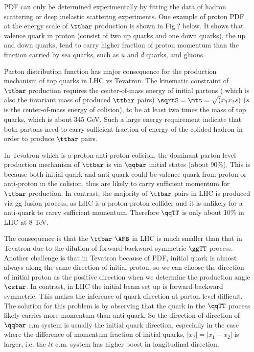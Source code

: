 PDF can only be determined experimentally by fitting the data of hadron scattering or deep inelastic scattering experiments. One example of proton PDF at the energy scale of $\ttbar$ production is shown in Fig.? below. It shows that valence quark in proton (consist of two up quarks and one down quarks), the up and down quarks, tend to carry higher fraction of proton momentum than the fraction carried by sea quarks, such as $\bar u$ and $\bar d$ quarks, and gluons.  

Parton distribution function has major consequence for the production mechanism of top quarks in LHC vs Tevatron. The kinematic constraint of $\ttbar$ production requires the center-of-mass energy of initial partons ( which is also the invariant mass of produced $\ttbar$ pairs) $\sqrtS=\mtt=\sqrt(x_1x_2s)$ ($s$ is the center-of-mass energy of colision), to be at least two times the mass of top quarks, which is about 345 GeV. Such a large energy requirement indicate that both partons need to carry sufficient fraction of energy of the colided hadron in order to produce $\ttbar$ pairs.  

In Tevatron which is a proton anti-proton colision, the dominant parton level production mechanism of $\ttbar$ is via $\qqbar$ initial states (about 90\%). This is because both initial quark and anti-quark could be valence quark from proton or anti-proton in the colision, thus are likely to carry sufficient momentum for $\ttbar$ production. In contrast, the majority of $\ttbar$ pairs in LHC is produced via gg fusion process, as LHC is a proton-proton collider and it is unlikely for a anti-quark to carry sufficient momentum. Therefore $\qqTT$ is only about 10\% in LHC at 8 TeV. 

The consequence is that the $\ttbar$ $\AFB$ in LHC is much smaller than that in Tevatron due to the dilution of forward-backward symmetric $\ggTT$ process. Another challenge is that in Tevatron because of PDF, initial quark is almost always along the same direction of initial proton, so we can choose the direction of initial proton as the positive direction when we determine the production angle $\cstar$. In contrast, in LHC the initial beam set up is forward-backward symmetric. This makes the inference of quark direction at parton level difficult. The solution for this problem is by observing that the quark in the $\qqTT$ process likely carries more momentum than anti-quark. So the direction of direction of $\qqbar$ c.m system is usually the initial quark direction, especially in the case where the difference of momentum fraction of initial quarks, $|x_f| = |x_1-x_2|$ is larger, i.e. the $t\bar t$ c.m. system has higher boost in longitudinal direction.  

